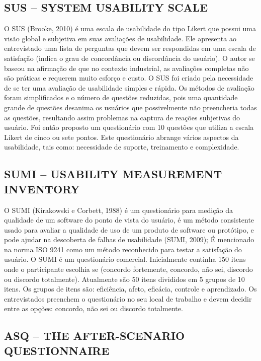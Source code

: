 \subsection{SUS – SYSTEM USABILITY SCALE}

O SUS (Brooke, 2010) é uma escala de usabilidade do tipo Likert que possui uma visão global e subjetiva em suas avaliações de usabilidade. Ele apresenta ao entrevistado uma lista de perguntas que devem ser respondidas em uma escala de satisfação (indica o grau de concordância ou discordância do usuário). 
O autor se baseou na afirmação de que no contexto industrial, as avaliações completas não são práticas e requerem muito esforço e custo. O SUS foi criado pela necessidade de se ter uma avaliação de usabilidade simples e rápida. Os métodos de avaliação foram simplificados e o número de questões reduzidas, pois uma quantidade grande de questões desanima os usuários que possivelmente não preencheria todas as questões, resultando assim problemas na captura de reações subjetivas do usuário. Foi então proposto um questionário com 10 questões que utiliza a escala Likert de cinco ou sete pontos. Este questionário abrange vários aspectos da usabilidade, tais como: necessidade de suporte, treinamento e complexidade.

\subsection{SUMI – USABILITY MEASUREMENT INVENTORY}

	O SUMI (Kirakowski e Corbett, 1988) é um questionário para medição da qualidade de um software do ponto de vista do usuário, é um método consistente usado para avaliar a qualidade de uso de um produto de software ou protótipo, e pode ajudar na descoberta de falhas de usabilidade (SUMI, 2009); É mencionado na norma ISO 9241 como um método reconhecido para testar a satisfação do usuário. O SUMI é um questionário comercial. 
	Inicialmente continha 150 itens onde o participante escolhia se (concordo fortemente, concordo, não sei, discordo ou discordo totalmente). Atualmente são 50 itens divididos em 5 grupos de 10 itens. Os grupos de itens são: eficiência, afeto, eficácia, controle e aprendizado. Os entrevistados preenchem o questionário no seu local de trabalho e devem decidir entre as opções: concordo, não sei ou discordo totalmente.

\subsection{ASQ – THE AFTER-SCENARIO QUESTIONNAIRE}

